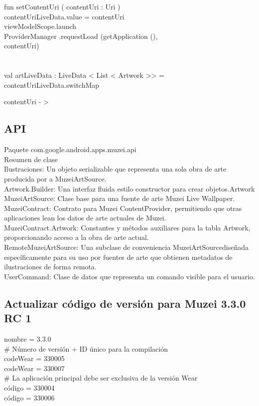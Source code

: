 \documentclass[12pt,a4paper]{article}
\begin{document}
    fun  setContentUri ( contentUri :  Uri ) {\\
        contentUriLiveData.value = contentUri\\
        viewModelScope.launch {\\
            ProviderManager .requestLoad (getApplication (),\\ contentUri)\\
        }\\
    }\\

    val artLiveData :  LiveData < List < Artwork >> = contentUriLiveData.switchMap {contentUri - >
    
    
    
  
\subsection{API}
Paquete com.google.android.apps.muzei.api\\
Resumen de clase\\
Ilustraciones:	Un objeto serializable que representa una sola obra de arte producida por a MuzeiArtSource.\\
Artwork.Builder:	Una interfaz fluida estilo constructor para crear objetos.Artwork
MuzeiArtSource:	Clase base para una fuente de arte Muzei Live Wallpaper.\\
MuzeiContract:	Contrato para Muzei ContentProvider, permitiendo que otras aplicaciones lean los datos de arte actuales de Muzei.\\
MuzeiContract.Artwork:	Constantes y métodos auxiliares para la tabla Artwork, proporcionando acceso a la obra de arte actual.\\
RemoteMuzeiArtSource:	Una subclase de conveniencia MuzeiArtSourcediseñada específicamente para su uso por fuentes de arte que obtienen metadatos de ilustraciones de forma remota.\\
UserCommand:	Clase de datos que representa un comando visible para el usuario.\\


\subsection{Actualizar código de versión para Muzei 3.3.0 RC 1}
nombre = 3.3.0\\
# Número de versión + ID único para la compilación\\
codeWear = 330005\\
codeWear = 330007\\
# La aplicación principal debe ser exclusiva de la versión Wear\\
código = 330004\\
código = 330006\\

}
\end{document}
